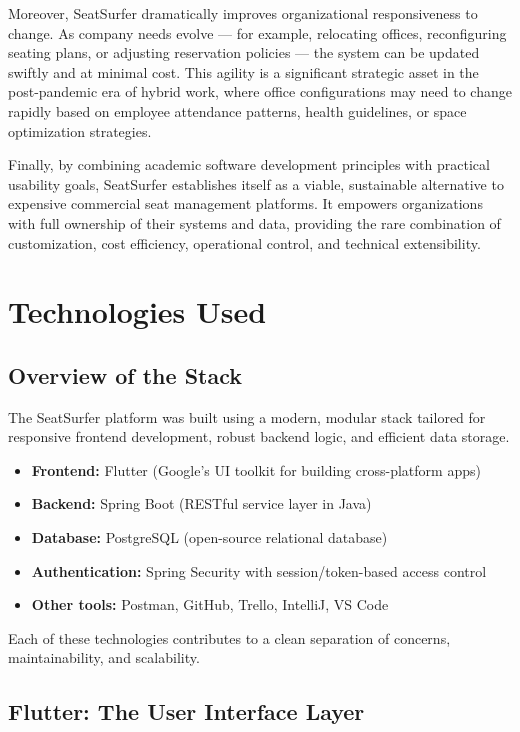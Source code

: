 \documentclass[12pt,a4paper]{report}
\begin{document}
Moreover, SeatSurfer dramatically improves organizational responsiveness to change. As company needs evolve — for example, relocating offices, reconfiguring seating plans, or adjusting reservation policies — the system can be updated swiftly and at minimal cost. This agility is a significant strategic asset in the post-pandemic era of hybrid work, where office configurations may need to change rapidly based on employee attendance patterns, health guidelines, or space optimization strategies.

Finally, by combining academic software development principles with practical usability goals, SeatSurfer establishes itself as a viable, sustainable alternative to expensive commercial seat management platforms. It empowers organizations with full ownership of their systems and data, providing the rare combination of customization, cost efficiency, operational control, and technical extensibility.

\newpage

\chapter{Technologies Used}

\section{Overview of the Stack}

The SeatSurfer platform was built using a modern, modular stack tailored for responsive frontend development, robust backend logic, and efficient data storage.

\begin{itemize}
    \item \textbf{Frontend:} Flutter (Google's UI toolkit for building cross-platform apps)
    \item \textbf{Backend:} Spring Boot (RESTful service layer in Java)
    \item \textbf{Database:} PostgreSQL (open-source relational database)
    \item \textbf{Authentication:} Spring Security with session/token-based access control
    \item \textbf{Other tools:} Postman, GitHub, Trello, IntelliJ, VS Code
\end{itemize}

Each of these technologies contributes to a clean separation of concerns, maintainability, and scalability.

\section{Flutter: The User Interface Layer}
\end{document}
